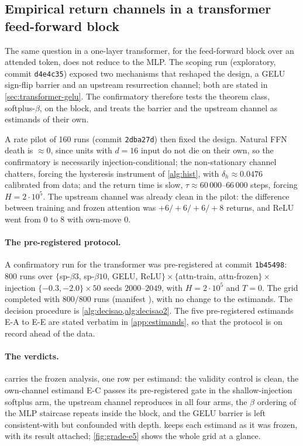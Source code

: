 \documentclass[11pt]{article}
\theoremstyle{definition}
\theoremstyle{remark}
\begin{document}
\subsection{Empirical return channels in a transformer feed-forward
block}\label{sec:transformer}

The same question in a one-layer transformer, for the feed-forward block over an
attended token, does not reduce to the MLP. The scoping run (exploratory, commit
\texttt{d4e4c35}) exposed two mechanisms that reshaped the design, a GELU
sign-flip barrier and an upstream resurrection channel; both are stated in
\cref{sec:transformer-gelu}. The confirmatory therefore tests the theorem class,
softplus-$\beta$, on the block, and treats the barrier and the upstream channel
as estimands of their own.

A rate pilot of 160 runs (commit \texttt{2dba27d}) then fixed the design. Natural
FFN death is $\approx0$, since units with $d=16$ input do not die on their own,
so the confirmatory is necessarily injection-conditional; the non-stationary
channel chatters, forcing the hysteresis instrument of \cref{alg:hist}, with
$\delta_h\approx0.0476$ calibrated from data; and the return time is
slow, $\tau\approx60\,000$--$66\,000$ steps, forcing
$H=2\cdot10^{5}$. The upstream channel was already clean in the pilot: the
difference between training and frozen attention was $+6/+6/+6/+8$ returns, and
ReLU went from $0$ to $8$ with own-move $0$.

\paragraph{The pre-registered protocol.}
A confirmatory run for the transformer was pre-registered at commit
\texttt{1b45498}: 800 runs over
$\{$sp-$\beta3$, sp-$\beta10$, GELU, ReLU$\}\times\{$attn-train,
attn-frozen$\}\times$ injection $\{-0.3,-2.0\}\times50$ seeds $2000$--$2049$,
with $H=2\cdot10^{5}$ and $T=0$. The grid completed with $800/800$ runs
(manifest ), with no change to the estimands. The
decision procedure is \cref{alg:decisao,alg:decisao2}. The five pre-registered
estimands E-A
to E-E are stated verbatim in \cref{app:estimands}, so that the protocol is on
record ahead of the data.

\paragraph{The verdicts.}
 carries the frozen analysis, one row per estimand: the validity
control is clean, the own-channel estimand E-C passes its pre-registered gate
in the shallow-injection softplus arm, the upstream channel reproduces in all
four arms, the $\beta$ ordering of the
MLP staircase repeats inside the block, and the GELU barrier is left
consistent-with but confounded with depth.  keeps each
estimand as it was frozen, with its result attached; \cref{fig:grade-e5} shows
the whole grid at a glance.
\end{document}
